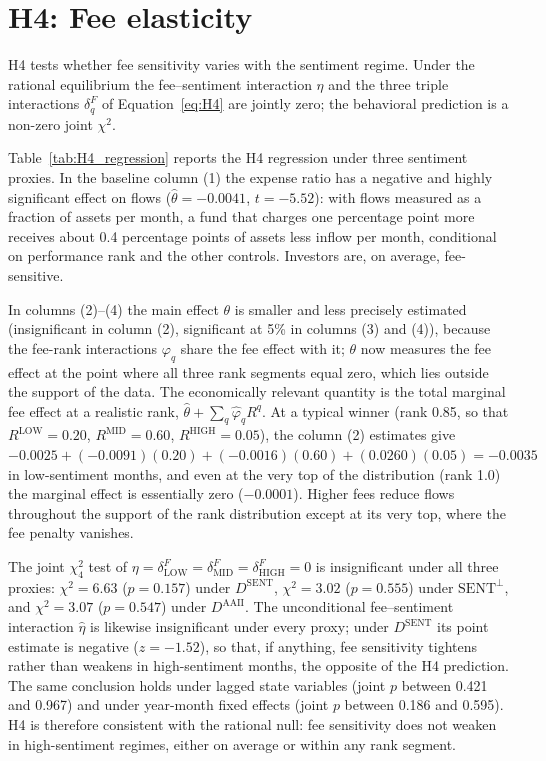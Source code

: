 \documentclass[12pt, oneside]{report}
\let\phi\varphi
\begin{document}
\section{H4: Fee elasticity}
\label{sec:H4}

H4 tests whether fee sensitivity varies with the sentiment regime. Under
the \textcite{BerkGreen2004} rational equilibrium the fee--sentiment
interaction $\eta$ and the three triple interactions $\delta^F_q$ of
Equation~\ref{eq:H4} are jointly zero; the behavioral prediction is a
non-zero joint $\chi^2$.



\noindent Table~\ref{tab:H4_regression} reports the H4 regression under
three sentiment proxies. In the baseline column (1) the expense ratio has
a negative and highly significant effect on flows
($\hat{\theta} = -0.0041$, $t = -5.52$): with flows measured as a
fraction of assets per month, a fund that charges one percentage point
more receives about 0.4 percentage points of assets less inflow per
month, conditional on performance rank and the other controls. Investors
are, on average, fee-sensitive.

In columns (2)--(4) the main effect $\theta$ is smaller and less
precisely estimated (insignificant in column (2), significant at 5\%
in columns (3) and (4)), because the fee-rank interactions $\phi_q$ share
the fee effect with it; $\theta$ now measures the fee effect at the point
where all three rank segments equal zero, which lies outside the support
of the data. The economically relevant quantity is the total marginal fee
effect at a realistic rank, $\hat{\theta} + \sum_q \hat{\phi}_q R^q$. At a
typical winner (rank 0.85, so that $R^{\text{LOW}} = 0.20$,
$R^{\text{MID}} = 0.60$, $R^{\text{HIGH}} = 0.05$), the column (2)
estimates give $-0.0025 + (-0.0091)(0.20) + (-0.0016)(0.60) +
(0.0260)(0.05) = -0.0035$ in low-sentiment months, and even at the very
top of the distribution (rank 1.0) the marginal effect is essentially
zero ($-0.0001$). Higher fees reduce flows throughout the support of the
rank distribution except at its very top, where the fee penalty
vanishes.

The joint $\chi^2_4$ test of $\eta = \delta^F_{\text{LOW}} =
\delta^F_{\text{MID}} = \delta^F_{\text{HIGH}} = 0$ is insignificant under
all three proxies: $\chi^2 = 6.63$ ($p = 0.157$) under $D^{\text{SENT}}$,
$\chi^2 = 3.02$ ($p = 0.555$) under $\text{SENT}^{\perp}$, and
$\chi^2 = 3.07$ ($p = 0.547$) under $D^{\text{AAII}}$. The unconditional
fee--sentiment interaction $\hat{\eta}$ is likewise insignificant under
every proxy; under $D^{\text{SENT}}$ its point estimate is negative
($z = -1.52$), so that, if anything, fee sensitivity tightens rather than
weakens in high-sentiment months, the opposite of the H4 prediction. The same conclusion holds under lagged state
variables (joint $p$ between 0.421 and 0.967) and under year-month fixed
effects (joint $p$ between 0.186 and 0.595). H4 is therefore consistent
with the \textcite{BerkGreen2004} rational null: fee sensitivity does not
weaken in high-sentiment regimes, either on average or within any rank
segment.
\end{document}
